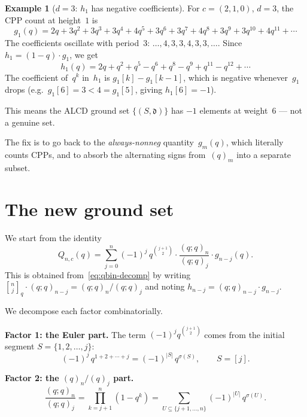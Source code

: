 \documentclass[11pt]{article}
\newcommand{\qpochn}[3]{(#1;#2)_{#3}}
\newcommand{\qbin}[2]{\genfrac{[}{]}{0pt}{}{#1}{#2}}
\theoremstyle{plain}
\theoremstyle{definition}
\newtheorem{example}[theorem]{Example}
\begin{document}
\begin{example}[$d = 3$: $h_1$ has negative coefficients]
\label{ex:h1-negative}
For $c = (2, 1, 0)$, $d = 3$, the CPP count at height~$1$
is
\[
  g_1(q) = 2q + 3q^2 + 3q^3 + 3q^4 + 4q^5 + 3q^6
    + 3q^7 + 4q^8 + 3q^9 + 3q^{10} + 4q^{11} + \cdots
\]
The coefficients oscillate with period~$3$:
$\ldots, 4, 3, 3, 4, 3, 3, \ldots$.  Since
$h_1 = (1-q) \cdot g_1$, we get
\[
  h_1(q)
  = 2q + q^2 + q^5 - q^6 + q^8 - q^9 + q^{11} - q^{12}
    + \cdots
\]
The coefficient of~$q^k$ in~$h_1$ is $g_1[k] - g_1[k-1]$,
which is negative whenever~$g_1$ drops (e.g.\
$g_1[6] = 3 < 4 = g_1[5]$, giving $h_1[6] = -1$).

This means the ALCD ground set $\{(S, \mathfrak{d})\}$ has
$-1$ elements at weight~$6$ --- not a genuine set.
\end{example}

The fix is to go back to the \emph{always-nonneg}
quantity~$g_m(q)$, which literally counts CPPs, and to
absorb the alternating signs from~$(q)_m$ into a separate
subset.


\section{The new ground set}

We start from the identity
\begin{equation}\label{eq:Q-from-gk}
  Q_{n,c}(q)
  = \sum_{j=0}^{n} (-1)^j \, q^{\binom{j+1}{2}}
    \cdot \frac{\qpochn{q}{q}{n}}{\qpochn{q}{q}{j}}
    \cdot g_{n-j}(q).
\end{equation}
This is obtained from~\eqref{eq:qbin-decomp} by writing
$\qbin{n}{j}_q \cdot \qpochn{q}{q}{n-j} = \qpochn{q}{q}{n}/\qpochn{q}{q}{j}$
and noting $h_{n-j} = \qpochn{q}{q}{n-j} \cdot g_{n-j}$.

We decompose each factor combinatorially.

\medskip\noindent
\textbf{Factor 1: the Euler part.}
The term $(-1)^j q^{\binom{j+1}{2}}$ comes from the
initial segment $S = \{1, 2, \ldots, j\}$:
\begin{equation}\label{eq:euler-factor}
  (-1)^j \, q^{1 + 2 + \cdots + j}
  = (-1)^{|S|} \, q^{\sigma(S)},
  \qquad S = [j].
\end{equation}

\medskip\noindent
\textbf{Factor 2: the $(q)_n / (q)_j$ part.}
\begin{equation}\label{eq:qn-qj-factor}
  \frac{\qpochn{q}{q}{n}}{\qpochn{q}{q}{j}}
  = \prod_{k=j+1}^{n} (1 - q^k)
  = \sum_{U \subseteq \{j+1, \ldots, n\}}
    (-1)^{|U|} \, q^{\sigma(U)}.
\end{equation}
\end{document}
